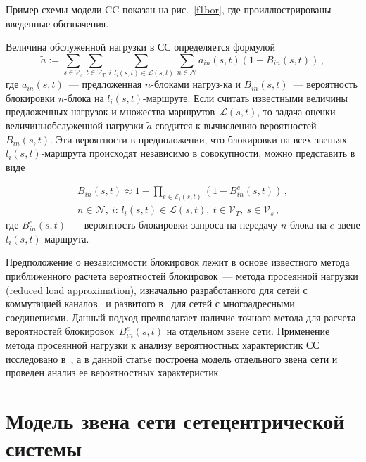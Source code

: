 \begin{multicols}{2}

Пример схемы модели CC показан на рис.~\ref{f1bor}, где 
проиллюстрированы введенные обозначения.

 
  Величина обслуженной нагрузки в СС определяется формулой
  $$
  \tilde{a} := \sum\limits_{s\in {\mathcal V}_s }\sum\limits_{t\in {\mathcal V}_T} 
\sum\limits_{i:l_i(s,t)\in {\mathcal L}(s,t)} \sum\limits_{n\in {\mathcal N}} 
a_{in}(s,t) (1- B_{in}(s,t))\,,
  $$
  где $a_{in}(s,t)$~--- предложенная $n$-блоками нагруз-\linebreak ка и $B_{in}(s,t)$~--- 
вероятность блокировки $n$-блока на $l_i(s,t)$-маршруте. Если считать 
известными ве\-личины предложенных нагрузок и множества маршрутов~${\mathcal 
L}(s,t)$, то задача оценки величины\linebreak обслуженной нагрузки $\tilde{a}$ сводится 
к вычислению вероятностей~$B_{in}(s,t)$. Эти вероятности в предположении, 
что блокировки на всех звеньях~$l_i(s,t)$-маршрута происходят независимо в 
совокупности, можно представить в виде

\noindent
\begin{multline*}
B_{in} (s,t)\approx 1- \prod_{e\in {\mathcal E}_i(s,t)} \left ( 1-B_{in}^e (s,t)\right)\,,\\
n\in {\mathcal N},\ i\mbox{:\ }l_i(s,t)\in {\mathcal L}(s,t),\ t\in{\mathcal V}_T,\ s\in {\mathcal V}_s\,,
\end{multline*}
где $B_{in}^e(s,t)$~--- вероятность блокировки запроса на передачу $n$-блока 
на $e$-звене  $l_i(s,t)$-маршрута.
  
  Предположение о независимости блокировок лежит в основе известного 
метода приближенного расчета вероятностей блокировок~--- метода 
просеянной нагрузки (reduced load approximation), изначально разработанного 
для сетей с коммутацией каналов~\cite{3bor} и развитого в~\cite{4bor} для 
сетей с многоадресными соединениями. Данный подход предполагает наличие 
точного метода для расчета вероятностей блокировок~$B_{in}^e(s,t)$ на 
отдельном звене сети. Применение метода просеянной нагрузки к анализу 
вероятностных характеристик СС исследовано в~\cite{5bor}, а в данной статье 
построена модель отдельного звена сети и проведен анализ ее вероятностных 
характеристик.
  
  \section{Модель звена сети сетецентрической системы}
  

\end{multicols}
